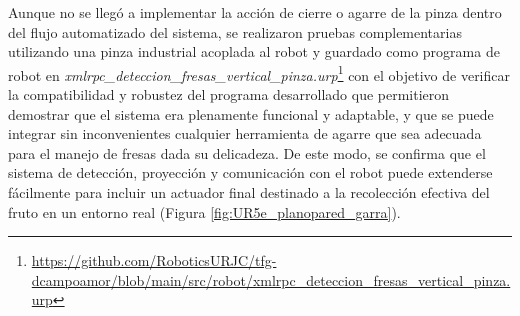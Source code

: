 Aunque no se llegó a implementar la acción de cierre o agarre de la pinza dentro del flujo automatizado del sistema, se realizaron pruebas complementarias utilizando una pinza industrial acoplada al robot y guardado como programa de robot en \textit{xmlrpc\_deteccion\_fresas\_vertical\_pinza.urp}\footnote{\url{https://github.com/RoboticsURJC/tfg-dcampoamor/blob/main/src/robot/xmlrpc_deteccion_fresas_vertical_pinza.urp}} con el objetivo de verificar la compatibilidad y robustez del programa desarrollado que permitieron demostrar que el sistema era plenamente funcional y adaptable, y que se puede integrar sin inconvenientes cualquier herramienta de agarre que sea adecuada para el manejo de fresas dada su delicadeza. De este modo, se confirma que el sistema de detección, proyección y comunicación con el robot puede extenderse fácilmente para incluir un actuador final destinado a la recolección efectiva del fruto en un entorno real (Figura \ref{fig:UR5e_planopared_garra}).

